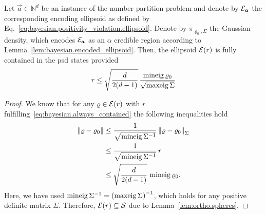 \begin{lemma}\label{lem:bayesian.always_contained}
  Let $\vec a \in \mathbb{N}^d$ be an instance of the number partition problem and denote by $\mathcal{E}_{{\boldsymbol{a}}}$ the corresponding encoding ellipsoid as defined by Eq.~\eqref{eq:bayesian.positivity_violation.ellipsoid}.
  Denote by $\pi_{\varrho_0,\Sigma}$ the Gaussian density, which encodes $\mathcal{E}_{{\boldsymbol{a}}}$ as an $\alpha$ credible region according to Lemma~\ref{lem:bayesian.encoded_ellipsoid}.
  Then, the ellipsoid $\mathcal{E}(r)$ is fully contained in the psd states provided
  \[
    \label{eq:bayesian.always_contained}
    r \le \sqrt{\frac{d}{2(d-1)}} \, \frac{\operatorname{mineig}\varrho_0}{\sqrt{\operatorname{maxeig}\Sigma}}
  \]
\end{lemma}
\begin{proof}
  We know that for any $\varrho \in \mathcal{E}(r)$ with $r$ fulfilling~\eqref{eq:bayesian.always_contained} the following inequalities hold
  \begin{align*}
    {\Vert\varrho - \varrho_0\Vert}
    &\le \frac{1}{\sqrt{\operatorname{mineig}\Sigma^{-1}}}\, {\Vert\varrho - \varrho_0\Vert}_\Sigma \\
    &\le \frac{1}{\sqrt{\operatorname{mineig}\Sigma^{-1}}}\, r \\
    &\le \sqrt{\frac{d}{2(d-1)}}\, \operatorname{mineig} \varrho_0.
  \end{align*}
  Here, we have used $\operatorname{mineig}\Sigma^{-1} = {(\operatorname{maxeig} \Sigma)}^{-1}$, which holds for any positive definite matrix $\Sigma$.
  Therefore, $\mathcal{E}(r) \subseteq \mathcal{S}$ due to Lemma~\ref{lem:ortho.spheres}.
\end{proof}


